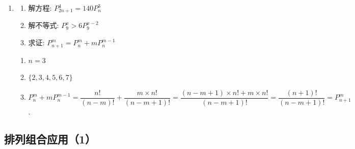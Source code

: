 \begin{enumerate}
\begin{enumerate}
    \end{enumerate} 
    \begin{jieda}
        \begin{enumerate}
            \item $x = 3$
            \item $\mathop{\sum }\limits_{{k = 1}}^{n}k\left( {k + 1}\right) \left( {k + 2}\right)  = 6\mathop{\sum }\limits_{{k = 1}}^{n}C_{k+2}^3 = 6C_{n+3}^4 = 6 \times \dfrac{n(n+1)(n+2)}{P_4^4} = \dfrac{n \cdot  \left( {n + 1}\right)  \cdot  \left( {n + 2}\right)  \cdot  \left( {n + 3}\right) }{4}$
        \end{enumerate}
    \end{jieda}
    \item \begin{enumerate}
        \item 解方程: ${P}_{{2n} + 1}^{4} = {140}{P}_{n}^{3}$
        \item 解不等式: ${P}_{9}^{x} > 6{P}_{9}^{x - 2}$
        \item 求证: ${P}_{n + 1}^{m} = {P}_{n}^{m} + m{P}_{n}^{m - 1}$
    \end{enumerate}
    \begin{jieda}
        \begin{enumerate}
            \item $n = 3$
            \item $\{2,3,4,5,6,7\}$
            \item $P_{n}^{m} + mP_{n}^{m - 1} = \dfrac{n!}{\left( {n - m}\right) !} + \dfrac{m \times  n!}{\left( {n - m + 1}\right) !} = \dfrac{\left( {n - m + 1}\right)  \times  n! + m \times  n!}{\left( {n - m + 1}\right) !} = \dfrac{\left( {n + 1}\right) !}{\left( {n - m + 1}\right) !} = P_{n + 1}^{m}$.
        \end{enumerate}
    \end{jieda}
    
\end{enumerate}


\clearpage
\subsection*{排列组合应用（1）}

